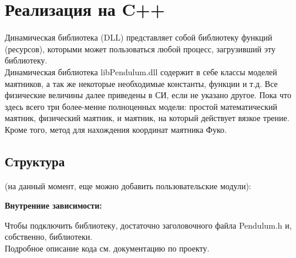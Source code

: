 \section*{Реализация на C++}
Динамическая библиотека (DLL) представляет собой библиотеку функций (ресурсов), которыми может пользоваться любой процесс, загрузивший эту библиотеку.\\
Динамическая библиотека libPendulum.dll содержит в себе классы моделей маятников, а так же некоторые необходимые константы, функции и т.д. Все физические величины далее приведены в СИ, если не указано другое. Пока что здесь всего три более-менне полноценных модели: простой математический маятник, физический маятник, и маятник, на который действует вязкое трение. Кроме того, метод для нахождения координат маятника Фуко. \\
\subsection*{Структура}
{ (на данный момент, еще можно добавить пользовательские модули):}
\begin{center}
\end{center}
{\centering \bfseries Внутренние зависимости:}
\begin{center}
\end{center}
Чтобы подключить библиотеку, достаточно заголовочного файла Pendulum.h и, собственно, библиотеки.\\
Подробное описание кода см. документацию по проекту.
